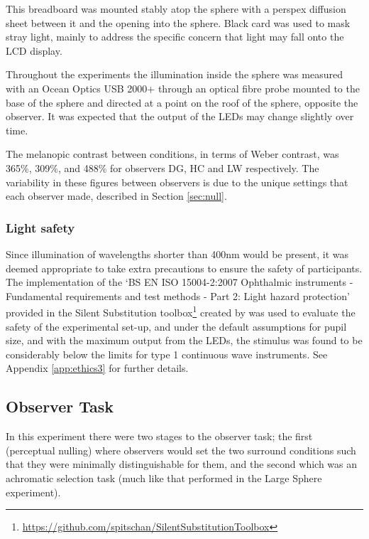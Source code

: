 This breadboard was mounted stably atop the sphere with a perspex diffusion sheet between it and the opening into the sphere. Black card was used to mask stray light, mainly to address the specific concern that light may fall onto the LCD display.


Throughout the experiments the illumination inside the sphere was measured with an Ocean Optics USB 2000+ through an optical fibre probe mounted to the base of the sphere and directed at a point on the roof of the sphere, opposite the observer. It was expected that the output of the \glspl{LED} may change slightly over time. %

The melanopic contrast between conditions, in terms of Weber contrast, was 365\%, 309\%, and 488\% for observers DG, HC and LW respectively. The variability in these figures between observers is due to the unique settings that each observer made, described in Section \ref{sec:null}.

\subsubsection{Light safety}
Since illumination of wavelengths shorter than 400nm would be present, it was deemed appropriate to take extra precautions to ensure the safety of participants. 
The implementation of the `BS EN ISO 15004-2:2007 Ophthalmic instruments - Fundamental requirements and test methods - Part 2: Light hazard protection' \citep{iso/tc_172/sc_7_ophthalmic_optics_and_instruments_bs_2007} provided in the Silent Substitution toolbox\footnote{\url{https://github.com/spitschan/SilentSubstitutionToolbox}} created by \citet{spitschan_selective_2015} was used to evaluate the safety of the experimental set-up, and under the default assumptions for pupil size, and with the maximum output from the LEDs, the stimulus was found to be considerably below the limits for type 1 continuous wave instruments. See Appendix \ref{app:ethics3} for further details.


\subsection{Observer Task}

In this experiment there were two stages to the observer task; the first (perceptual nulling) where observers would set the two surround conditions such that they were minimally distinguishable for them, and the second which was an achromatic selection task (much like that performed in the Large Sphere experiment).

